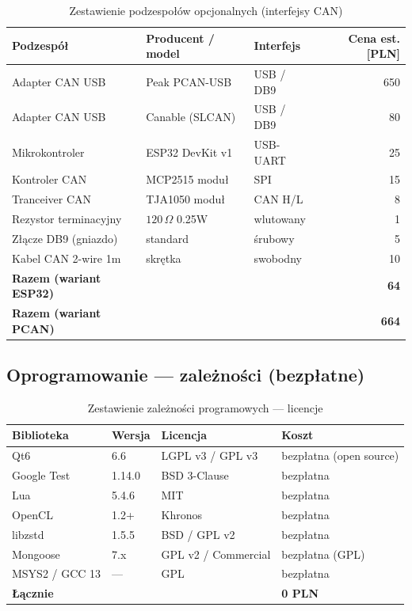 \documentclass[12pt, a4paper]{article}
\begin{document}
\begin{table}[H]
\caption{Zestawienie podzespołów opcjonalnych (interfejsy CAN)}
\label{tab:bom}
\centering
\small
\begin{tabular}{lllr}
\toprule
\textbf{Podzespół} & \textbf{Producent / model} & \textbf{Interfejs} & \textbf{Cena est. [PLN]} \\
\midrule
Adapter CAN USB     & Peak PCAN-USB          & USB / DB9    & 650 \\
Adapter CAN USB     & Canable (SLCAN)        & USB / DB9    & 80  \\
Mikrokontroler      & ESP32 DevKit v1        & USB-UART     & 25  \\
Kontroler CAN       & MCP2515 moduł          & SPI          & 15  \\
Tranceiver CAN      & TJA1050 moduł          & CAN H/L      & 8   \\
Rezystor terminacyjny & $120\,\Omega$ 0.25W  & wlutowany    & 1   \\
Złącze DB9 (gniazdo) & standard              & śrubowy      & 5   \\
Kabel CAN 2-wire 1m  & skrętka               & swobodny     & 10  \\
\midrule
\textbf{Razem (wariant ESP32)} & & & \textbf{64} \\
\textbf{Razem (wariant PCAN)}  & & & \textbf{664} \\
\bottomrule
\end{tabular}
\end{table}

\subsection{Oprogramowanie --- zależności (bezpłatne)}

\begin{table}[H]
\caption{Zestawienie zależności programowych --- licencje}
\label{tab:licenses}
\centering
\small
\begin{tabular}{llll}
\toprule
\textbf{Biblioteka} & \textbf{Wersja} & \textbf{Licencja} & \textbf{Koszt} \\
\midrule
Qt6                & 6.6       & LGPL v3 / GPL v3  & bezpłatna (open source) \\
Google Test        & 1.14.0    & BSD 3-Clause      & bezpłatna \\
Lua                & 5.4.6     & MIT               & bezpłatna \\
OpenCL             & 1.2+      & Khronos           & bezpłatna \\
libzstd            & 1.5.5     & BSD / GPL v2      & bezpłatna \\
Mongoose           & 7.x       & GPL v2 / Commercial & bezpłatna (GPL) \\
MSYS2 / GCC 13     & ---       & GPL               & bezpłatna \\
\midrule
\textbf{Łącznie}   &           &                   & \textbf{0 PLN} \\
\bottomrule
\end{tabular}
\end{table}
\end{document}
